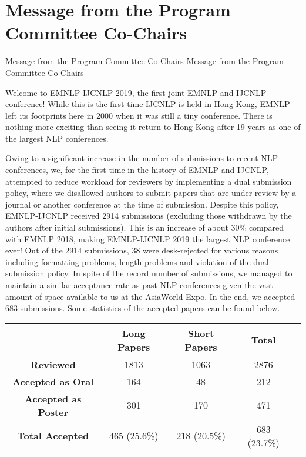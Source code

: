 \section{Message from the Program Committee Co-Chairs}
\setheaders%
    {Message from the Program Committee Co-Chairs}%
    {Message from the Program Committee Co-Chairs}
\thispagestyle{emptyheader}


\setlength{\parskip}{.7ex}

Welcome to EMNLP-IJCNLP 2019, the first joint EMNLP and IJCNLP conference! While this is the first time IJCNLP is held in Hong Kong, EMNLP left its footprints here in 2000 when it was still a tiny conference. There is nothing more exciting than seeing it return to Hong Kong after 19 years as one of the largest NLP conferences.

Owing to a significant increase in the number of submissions to recent NLP conferences, we, for the first time in the history of EMNLP and IJCNLP, attempted to reduce workload for reviewers by implementing a dual submission policy, where we disallowed authors to submit papers that are under review by a journal or another conference at the time of submission. Despite this policy, EMNLP-IJCNLP received 2914 submissions (excluding those withdrawn by the authors after initial submissions). This is an increase of about 30\% compared with EMNLP 2018, making EMNLP-IJCNLP 2019 the largest NLP conference ever! Out of the 2914 submissions, 38 were desk-rejected for various reasons including formatting problems, length problems and violation of the dual submission policy. In spite of the record number of submissions, we managed to maintain a similar acceptance rate as past NLP conferences given the vast amount of space available to us at the AsiaWorld-Expo. In the end, we accepted 683 submissions. Some statistics of the accepted papers can be found below.


\begin{table}[h]
    \begin{center}
\begin{tabular}[h]{|c|c|c|c|c|}
\hline
    & \textbf{Long Papers} & \textbf{Short Papers} & \textbf{Total} \\
\hline
    \textbf{Reviewed} & 1813 & 1063 & 2876 \\
\hline
    \textbf{Accepted as Oral} & 164 &  48 & 212 \\
\hline
    \textbf{Accepted as Poster} & 301 & 170 & 471 \\
\hline
    \textbf{Total Accepted} & 465 (25.6\%) &  218 (20.5\%) & 683 (23.7\%) \\
\hline
\end{tabular}
    \end{center}
\end{table}

